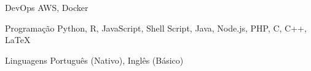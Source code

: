 

\begin{cvskills}

 \cvskill
    {DevOps} %
    {AWS, Docker} %




  \cvskill
    {Programação} %
    {Python, R, JavaScript, Shell Script, Java, Node.js, PHP, C, C++, LaTeX} %

  \cvskill
    {Linguagens} %
    {Português (Nativo), Inglês (Básico)} %

\end{cvskills}
